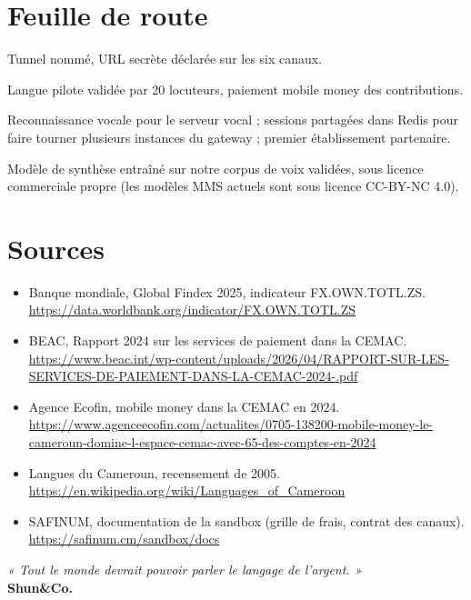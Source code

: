 \documentclass[11pt,a4paper]{article}
\begin{document}
\section{Feuille de route}
\begin{description}[leftmargin=0pt]
  \item[Jour J.] Tunnel nommé, URL secrète déclarée sur les six canaux.
  \item[Mois 1.] Langue pilote validée par 20 locuteurs, paiement mobile money des contributions.
  \item[Mois 3.] Reconnaissance vocale pour le serveur vocal ; sessions partagées dans Redis pour faire tourner plusieurs instances du gateway ; premier établissement partenaire.
  \item[Mois 6.] Modèle de synthèse entraîné sur notre corpus de voix validées, sous licence commerciale propre (les modèles MMS actuels sont sous licence CC-BY-NC 4.0).
\end{description}

\section*{Sources}
{\footnotesize
\begin{itemize}
  \item Banque mondiale, Global Findex 2025, indicateur FX.OWN.TOTL.ZS. \url{https://data.worldbank.org/indicator/FX.OWN.TOTL.ZS}
  \item BEAC, Rapport 2024 sur les services de paiement dans la CEMAC. \url{https://www.beac.int/wp-content/uploads/2026/04/RAPPORT-SUR-LES-SERVICES-DE-PAIEMENT-DANS-LA-CEMAC-2024-.pdf}
  \item Agence Ecofin, mobile money dans la CEMAC en 2024. \url{https://www.agenceecofin.com/actualites/0705-138200-mobile-money-le-cameroun-domine-l-espace-cemac-avec-65-des-comptes-en-2024}
  \item Langues du Cameroun, recensement de 2005. \url{https://en.wikipedia.org/wiki/Languages_of_Cameroon}
  \item SAFINUM, documentation de la sandbox (grille de frais, contrat des canaux). \url{https://safinum.cm/sandbox/docs}
\end{itemize}}

\vspace{0.4em}
\begin{center}
{\large\itshape\color{indigo} « Tout le monde devrait pouvoir parler le langage de l'argent. »}\\[4pt]
{\bfseries Shun\&Co.}
\end{center}
\end{document}
